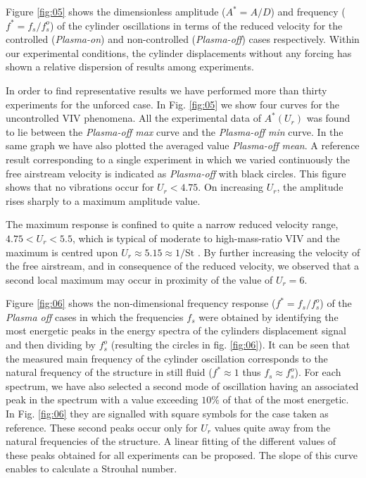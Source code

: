 \documentclass[review]{elsarticle}
\begin{document}
Figure \ref{fig:05} shows the dimensionless amplitude ($A^* =A / D$) and frequency ($f^* = f_s / f_s^o$) of the cylinder oscillations in terms of the reduced velocity for the controlled ({\it Plasma-on}) and non-controlled ({\it Plasma-off})  cases respectively. Within our experimental conditions, the cylinder displacements without any forcing  has shown a relative dispersion of results among experiments.

In order to find  representative results we have performed more than thirty experiments for the unforced case. In Fig. \ref{fig:05}  we show four curves for the uncontrolled VIV phenomena. All the experimental data of $A^*(U_r)$ was found to lie between the {\it Plasma-off max} curve and the {\it Plasma-off min} curve. In the same graph we have also plotted the averaged value  {\it Plasma-off mean}. A reference result corresponding to a single experiment in which we varied continuously the free airstream velocity is indicated as {\it Plasma-off} with black circles. This figure shows that no vibrations occur for $U_r < 4.75$. On increasing $U_r$, the amplitude rises sharply to a maximum amplitude value.

The maximum response is confined to quite a narrow reduced velocity range, $4.75 < U_r < 5.5$, which is typical of moderate to high-mass-ratio VIV and the maximum is centred upon $U_r \approx 5.15 \approx 1/\text{St}$ \citep{Blevins1990}. By further increasing the velocity of the free airstream, and in consequence of the reduced velocity, we observed that a second local maximum may occur in proximity of the value of $U_r=6$.

Figure \ref{fig:06} shows the non-dimensional frequency response ($f^*= f_s / f_s^o$) of the {\it Plasma off} cases in which  the frequencies $f_s $ were obtained by identifying the most energetic peaks in the energy spectra of the cylinders displacement signal and then dividing by $f_s^o$ (resulting the circles in fig. \ref{fig:06}). It can be seen that the measured main frequency of the cylinder oscillation corresponds to the natural frequency of the structure in still fluid ($f^* \approx 1$ thus $f_s \approx f_s^o$). For each spectrum, we have also selected a second mode of oscillation having an associated peak in the spectrum with a value exceeding $10\%$ of that of the most energetic. In Fig. \ref{fig:06} they are signalled with square symbols for the case taken as reference. These second peaks occur only for $U_r$ values quite away from the natural frequencies of the structure. A linear fitting of the different values of these peaks obtained for all experiments can be proposed. The slope of this curve enables to calculate a Strouhal number.
\end{document}
